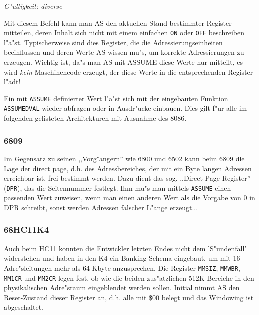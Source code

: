 \documentclass[12pt,a4paper,twoside]{report}
\newcommand{\tty}[1]{{\tt #1}}
\begin{document}

{\em G"ultigkeit: diverse}

Mit diesem Befehl kann man AS den aktuellen Stand bestimmter Register
mitteilen, deren Inhalt sich nicht mit einem einfachen \tty{ON} oder
\tty{OFF} beschreiben l"a"st.  Typischerweise sind dies Register, die die
Adressierungseinheiten beeinflussen und deren Werte AS wissen mu"s, um
korrekte Adressierungen zu erzeugen.  Wichtig ist, da"s man AS mit ASSUME
diese Werte nur mitteilt, es wird {\em kein} Maschinencode erzeugt, der
diese Werte in die entsprechenden Register l"adt!

Ein mit \tty{ASSUME} definierter Wert l"a"st sich mit der
eingebauten Funktion \tty{ASSUMEDVAL} wieder abfragen oder in
Ausdr"ucke einbauen.  Dies gilt f"ur alle im folgenden gelisteten
Architekturen mit Ausnahme des 8086.


\subsubsection{6809}

Im Gegensatz zu seinen ,,Vorg"angern'' wie 6800 und 6502 kann beim
6809 die Lage der direct page, d.h. des Adressbereiches, der mit ein
Byte langen Adressen erreichbar ist, frei bestimmt werden.  Dazu dient
das sog. ,,Direct Page Register'' (\tty{DPR}), das die Seitennummer
festlegt.  Ihm mu"s man mittels \tty{ASSUME} einen passenden Wert
zuweisen, wenn man einen anderen Wert als die Vorgabe von 0 in DPR
schreibt, sonst werden Adressen falscher L"ange erzeugt...



\subsubsection{68HC11K4}

Auch beim HC11 konnten die Entwickler letzten Endes nicht dem
'S"undenfall' widerstehen und haben in den K4 ein Banking-Schema
eingebaut, um mit 16 Adre"sleitungen mehr als 64 Kbyte anzusprechen.  Die
Register {\tt MMSIZ}, {\tt MMWBR}, {\tt MM1CR} und {\tt MM2CR} legen fest,
ob wie die beiden zus"atzlichen 512K-Bereiche in den physikalischen
Adre"sraum eingeblendet werden sollen.  Initial nimmt AS den Reset-Zustand
dieser Register an, d.h. alle mit \$00 belegt und das Windowing ist
abgeschaltet.
\end{document}
